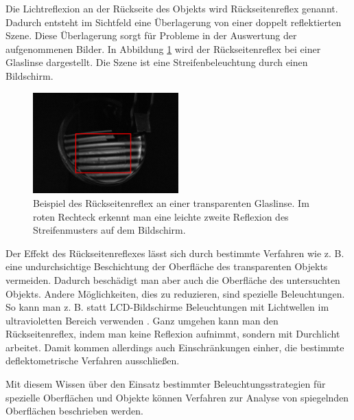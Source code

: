 \noindent
Die Lichtreflexion an der Rückseite des Objekts wird Rückseitenreflex genannt.
Dadurch entsteht im Sichtfeld eine Über\-la\-ge\-rung von einer doppelt reflektierten Szene.
Diese Über\-la\-ge\-rung sorgt für Probleme in der Auswertung der aufgenommenen Bilder.
In Abbildung \ref{img:rueckseitenreflexBeispiel} wird der Rückseitenreflex bei einer Glaslinse dargestellt.
Die Szene ist eine Streifenbeleuchtung durch einen Bildschirm.

\begin{figure}[H]
	\centering
	\includegraphics[width=0.5\textwidth]{02_grundlagenDerDeflektometrie/spiegelndeOberflaechen/figures/rueckseitenreflexBeispiel}
	\caption[Beispiel Rückseitenreflex]{Beispiel des Rückseitenreflex an einer transparenten Glaslinse. Im roten Rechteck erkennt man eine leichte zweite Reflexion des Streifenmusters auf dem Bildschirm.}
	\label{img:rueckseitenreflexBeispiel}
\end{figure}

\noindent
Der Effekt des Rückseitenreflexes lässt sich durch bestimmte Verfahren wie z. B. eine undurchsichtige Beschichtung der Oberfläche des transparenten Objekts vermeiden.
Dadurch beschädigt man aber auch die Oberfläche des untersuchten Objekts.
Andere Mög\-lich\-keiten, dies zu reduzieren, sind spezielle Beleuchtungen.
So kann man z. B. statt LCD-Bildschirme Beleuchtungen mit Lichtwellen im ultravioletten Bereich verwenden \cite{invisionUVDeflektometrie}.
Ganz umgehen kann man den Rückseitenreflex, indem man keine Reflexion aufnimmt, sondern mit Durchlicht arbeitet.
Damit kommen allerdings auch Einschränkungen einher, die bestimmte deflektometrische Verfahren ausschließen.

\p
Mit diesem Wissen über den Einsatz bestimmter Beleuchtungsstrategien für spezielle Oberflächen und Objekte können Verfahren zur Analyse von spiegelnden Oberflächen beschrieben werden.